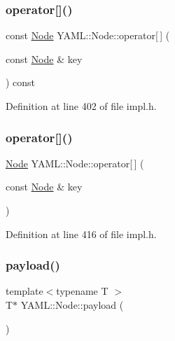 \subsubsection{\texorpdfstring{operator[]()}{operator[]()}\hspace{0.1cm}{\footnotesize\ttfamily [3/4]}}
{\footnotesize\ttfamily const \mbox{\hyperlink{class_y_a_m_l_1_1_node}{Node}} Y\+A\+M\+L\+::\+Node\+::operator\mbox{[}$\,$\mbox{]} (\begin{DoxyParamCaption}\item[{const \mbox{\hyperlink{class_y_a_m_l_1_1_node}{Node}} \&}]{key }\end{DoxyParamCaption}) const\hspace{0.3cm}{\ttfamily [inline]}}



Definition at line 402 of file impl.\+h.

\mbox{\label{class_y_a_m_l_1_1_node_a9f34a4c2a061a93cb49ba81203d27f3c}} 
\subsubsection{\texorpdfstring{operator[]()}{operator[]()}\hspace{0.1cm}{\footnotesize\ttfamily [4/4]}}
{\footnotesize\ttfamily \mbox{\hyperlink{class_y_a_m_l_1_1_node}{Node}} Y\+A\+M\+L\+::\+Node\+::operator\mbox{[}$\,$\mbox{]} (\begin{DoxyParamCaption}\item[{const \mbox{\hyperlink{class_y_a_m_l_1_1_node}{Node}} \&}]{key }\end{DoxyParamCaption})\hspace{0.3cm}{\ttfamily [inline]}}



Definition at line 416 of file impl.\+h.

\mbox{\label{class_y_a_m_l_1_1_node_a8dd1bef76169bd355c4e80e31d80f9bb}} 
\subsubsection{\texorpdfstring{payload()}{payload()}}
{\footnotesize\ttfamily template$<$typename T $>$ \\
T$\ast$ Y\+A\+M\+L\+::\+Node\+::payload (\begin{DoxyParamCaption}{ }\end{DoxyParamCaption})\hspace{0.3cm}{\ttfamily [inline]}}



